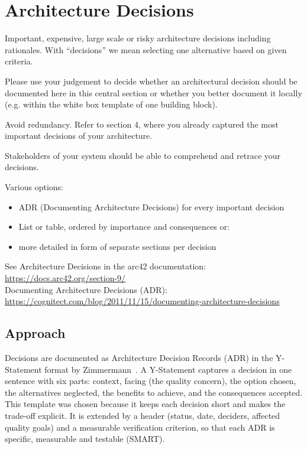 \section{Architecture Decisions}

Important, expensive, large scale or risky architecture decisions including rationales. With ``decisions'' we mean selecting one alternative based on given criteria.

Please use your judgement to decide whether an architectural decision should be documented here in this central section or whether you better document it locally (e.g. within the white box template of one building block).

Avoid redundancy. Refer to section 4, where you already captured the most important decisions of your architecture.

Stakeholders of your system should be able to comprehend and retrace your decisions.

Various options:
\begin{itemize}
  \item ADR (Documenting Architecture Decisions) for every important decision
  \item List or table, ordered by importance and consequences or:
  \item more detailed in form of separate sections per decision
\end{itemize}


See Architecture Decisions in the arc42 documentation:
\href{https://docs.arc42.org/section-9/}{https://docs.arc42.org/section-9/}\\
Documenting Architecture Decisions (ADR):\\
\href{https://cognitect.com/blog/2011/11/15/documenting-architecture-decisions}{https://cognitect.com/blog/2011/11/15/documenting-architecture-decisions}


\subsection{Approach}
Decisions are documented as Architecture Decision Records (ADR) in the Y-Statement format by Zimmermann~\cite{Zimmermann2020}.
A Y-Statement captures a decision in one sentence with six parts: context, facing (the quality concern), the option chosen, the alternatives neglected, the benefits to achieve, and the consequences accepted.
This template was chosen because it keeps each decision short and makes the trade-off explicit.
It is extended by a header (status, date, deciders, affected quality goals) and a measurable verification criterion, so that each ADR is specific, measurable and testable (SMART).
 
